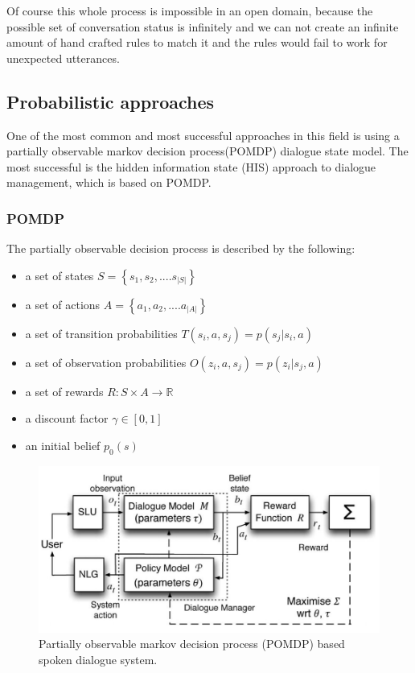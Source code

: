 \documentclass[conference]{IEEEtran}
\begin{document}
Of course this whole process is impossible in an open domain, because the possible set of conversation status is infinitely and we can not create an infinite amount of hand crafted rules to match it and the rules would fail to work for unexpected utterances\cite{wallace2009anatomy}.

\subsection{Probabilistic approaches}
One of the most common and most successful approaches in this field is using a partially observable markov decision process(POMDP)\cite{kaelbling1998planning}\cite{young2013pomdp} dialogue state model. The most successful is the hidden information state (HIS) approach to dialogue management\cite{young2007hidden}\cite{young2010hidden}, which is based on POMDP.

\subsubsection{POMDP}

The partially observable decision process is described by the following:
\begin{itemize}
\item{a set of states $S=\left \{ s_{1},s_{2},....s_{|S|}  \right \}$}
\item{a set of actions $A=\left \{ a_{1},a_{2},....a_{|A|}  \right \}$}
\item{a set of transition probabilities $T(s_{i},a,s_{j})=p(s_{j}|s_{i},a)$}
\item{a set of observation probabilities $O(z_{i},a,s_{j})=p(z_{i}|s_{j},a)$}
\item{a set of rewards $R:S\times A\rightarrow \mathbb{R}$}
\item{a discount factor $\gamma \in \left [ 0,1 \right ]$}
\item{an initial belief $p_{0}(s)$}
\end{itemize}

\begin{figure}[H]
\centering
   \includegraphics[width=\linewidth]{pomdp.jpg}
  \caption{Partially observable markov decision process (POMDP) based spoken dialogue system.\cite{young2013pomdp} }
  \label{fig:pomdp}
\end{figure}
\end{document}
